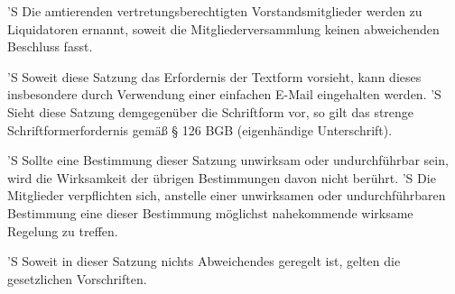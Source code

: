 \documentclass[a4paper,10pt]{scrreprt}
\begin{document}
\begin{contract}
'S Die amtierenden vertretungsberechtigten Vorstandsmitglieder werden zu
Liquidatoren ernannt, soweit die Mitgliederversammlung keinen abweichenden
Beschluss fasst.


'S Soweit diese Satzung das Erfordernis der Textform vorsieht, kann dieses
insbesondere durch Verwendung einer einfachen E-Mail eingehalten werden.
'S Sieht diese Satzung demgegenüber die Schriftform vor, so gilt das strenge
Schriftformerfordernis gemäß § 126 BGB (eigenhändige Unterschrift).

'S Sollte eine Bestimmung dieser Satzung unwirksam oder undurchführbar sein,
wird die Wirksamkeit der übrigen Bestimmungen davon nicht berührt.
'S Die Mitglieder verpflichten sich, anstelle einer unwirksamen oder
undurchführbaren Bestimmung eine dieser Bestimmung möglichst nahekommende
wirksame Regelung zu treffen.

'S Soweit in dieser Satzung nichts Abweichendes geregelt ist, gelten die
gesetzlichen Vorschriften.
\end{contract}
\end{document}
